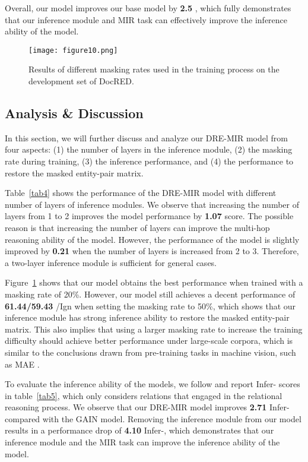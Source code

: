 \documentclass{article}
\begin{document}
\begin{table*}[th]
Overall, our model improves our base model by \textbf{2.5} , which fully demonstrates that our inference module and MIR task can effectively improve the inference ability of the model.


\begin{figure}[t]
\centering
\texttt{[image: figure10.png]}
\caption{Results of different masking rates used in the training process on the development set of DocRED. }
\label{fig4}
\end{figure}




\subsection{Analysis \& Discussion}
In this section, we will further discuss and analyze our DRE-MIR model from four aspects: (1) the number of layers in the inference module, (2) the masking rate during training, (3) the inference performance, and (4) the performance to restore the masked entity-pair matrix.

Table~\ref{tab4} shows the performance of the DRE-MIR model with different number of layers of inference modules.
We observe that increasing the number of layers from 1 to 2 improves the model performance by \textbf{1.07}  score.
The possible reason is that increasing the number of layers can improve the multi-hop reasoning ability of the model.
However, the performance of the model is slightly improved by \textbf{0.21}  when the number of layers is increased from 2 to 3.
Therefore, a two-layer inference module is sufficient for general cases.

Figure~\ref{fig4} shows that our model obtains the best performance when trained with a masking rate of 20\%.
However, our model still achieves a decent performance of \textbf{61.44/59.43} /Ign when setting the masking rate to 50\%, which shows that our inference module has strong inference ability to restore the masked entity-pair matrix.
This also implies that using a larger masking rate to increase the training difficulty should achieve better performance under large-scale corpora, which is similar to the conclusions drawn from pre-training tasks in machine vision, such as MAE \cite{c:25}.

To evaluate the inference ability of the models, we follow \cite{c:37,c:42} and report Infer- scores in table~\ref{tab5}, which only considers relations that engaged in the relational reasoning process. 
We observe that our DRE-MIR model improves \textbf{2.71} Infer- compared with the GAIN model.
Removing the inference module from our model results in a performance drop of \textbf{4.10} Infer-, which demonstrates that our inference module and the MIR task can improve the inference ability of the model.


\end{table*}
\end{document}
